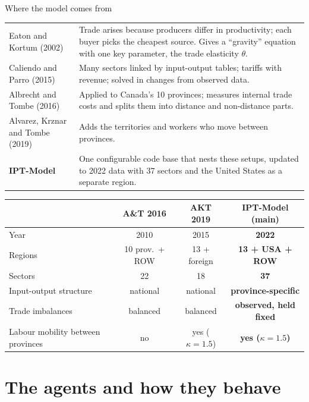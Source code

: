 \documentclass[aspectratio=169,9pt,t]{beamer}
\begin{document}
\begin{frame}{Where the model comes from}
  \small
  \begin{tabular}{@{}L{0.2\textwidth}L{0.75\textwidth}@{}}
    \toprule
    Eaton and Kortum (2002) & Trade arises because producers differ in
      productivity; each buyer picks the cheapest source. Gives a ``gravity''
      equation with one key parameter, the trade elasticity $\theta$.\\
    \addlinespace
    Caliendo and Parro (2015) & Many sectors linked by input-output tables;
      tariffs with revenue; solved in changes from observed data.\\
    \addlinespace
    Albrecht and Tombe (2016) & Applied to Canada's 10 provinces; measures
      internal trade costs and splits them into distance and non-distance
      parts.\\
    \addlinespace
    Alvarez, Krznar and Tombe (2019) & Adds the territories and
      workers who move between provinces.\\
    \addlinespace
    \textbf{IPT-Model} & One configurable code base that nests these
      setups, updated to 2022 data with 37 sectors and the United States as a
      separate region.\\
    \bottomrule
  \end{tabular}

  \bigskip
  \begin{tabular}{@{}lccc@{}}
    \toprule
     & A\&T 2016 & AKT 2019 & \textbf{IPT-Model (main)}\\
    \midrule
    Year & 2010 & 2015 & \textbf{2022}\\
    Regions & 10 prov.\ + ROW & 13 + foreign & \textbf{13 + USA + ROW}\\
    Sectors & 22 & 18 & \textbf{37}\\
    Input-output structure & national & national & \textbf{province-specific}\\
    Trade imbalances & balanced & balanced & \textbf{observed, held fixed}\\
    Labour mobility between provinces & no & yes ($\kappa=1.5$) & \textbf{yes ($\kappa=1.5$)}\\
    \bottomrule
  \end{tabular}
\end{frame}

\section{The agents and how they behave}
\end{document}
